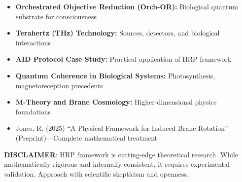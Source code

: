 \begin{itemize}
\item \textbf{Orchestrated Objective Reduction (Orch-OR):} Biological quantum substrate for consciousness
\item \textbf{Terahertz (THz) Technology:} Sources, detectors, and biological interactions
\item \textbf{AID Protocol Case Study:} Practical application of HRP framework
\item \textbf{Quantum Coherence in Biological Systems:} Photosynthesis, magnetoreception precedents
\item \textbf{M-Theory and Brane Cosmology:} Higher-dimensional physics foundations
\item Jones, R. (2025) ``A Physical Framework for Induced Brane Rotation'' (Preprint)---Complete mathematical treatment
\end{itemize}

\vspace{1em}

\textbf{DISCLAIMER}: HRP framework is cutting-edge theoretical research. While mathematically rigorous and internally consistent, it requires experimental validation. Approach with scientific skepticism and openness.
